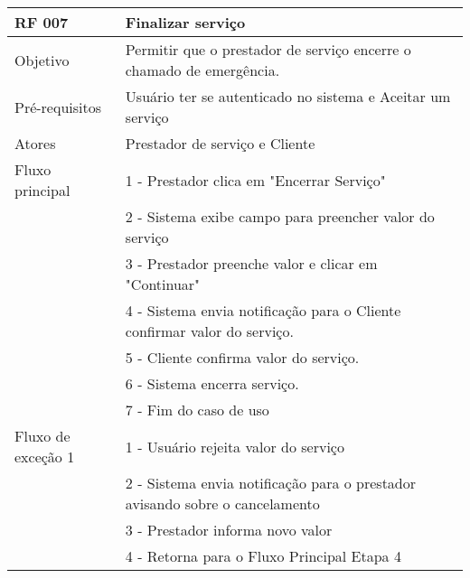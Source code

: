 \documentclass{article}
\begin{document}
\begin{table}[h!]
  \begin{center}
    \label{tab:table9}
    \begin{tabular}{|l|l|}
      \hline
      \textbf{RF 007} & \textbf{Finalizar serviço}\\
      \hline
      Objetivo          & Permitir que o prestador de serviço encerre o chamado de emergência. \\
      \hline
      Pré-requisitos    & Usuário ter se autenticado no sistema e Aceitar um serviço \\
      \hline
      Atores            & Prestador de serviço e Cliente \\
      \hline
      Fluxo principal   & 1 - Prestador clica em "Encerrar Serviço" \\
                        & 2 - Sistema exibe campo para preencher valor do serviço \\
                        & 3 - Prestador preenche valor e clicar em "Continuar" \\
                        & 4 - Sistema envia notificação para o Cliente confirmar valor do serviço.  \\
                        & 5 - Cliente confirma valor do serviço. \\
                        & 6 - Sistema encerra serviço. \\
                        & 7 - Fim do caso de uso \\
      \hline
      Fluxo de exceção 1    & 1 - Usuário rejeita valor do serviço \\
                            & 2 - Sistema envia notificação para o prestador avisando sobre o cancelamento \\
                            & 3 - Prestador informa novo valor \\
                            & 4 - Retorna para o Fluxo Principal Etapa 4 \\
      \hline
    \end{tabular}
  \end{center}
\end{table}
\end{document}
